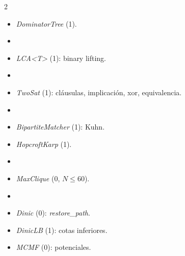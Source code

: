 \documentclass[10pt]{article}
\begin{document}
\begin{multicols}{2}
\begin{itemize}
  \item \textit{DominatorTree} (1).
  \item[\textbf{LCA}]
  \item \textit{LCA<T>} (1): binary lifting.
  \item[\textbf{Booleano}]
  \item \textit{TwoSat} (1): cláusulas, implicación, xor, equivalencia.
  \item[\textbf{Emparejamiento}]
  \item \textit{BipartiteMatcher} (1): Kuhn.
  \item \textit{HopcroftKarp} (1).
  \item[\textbf{Clique}]
  \item \textit{MaxClique} (0, $N \le 60$).
  \item[\textbf{Flujo}]
  \item \textit{Dinic} (0): \textit{restore\_path}.
  \item \textit{DinicLB} (1): cotas inferiores.
  \item \textit{MCMF} (0): potenciales.
\end{itemize}


\end{multicols}
\end{document}
